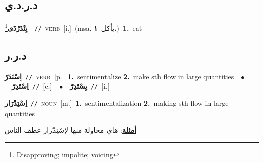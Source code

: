 \documentclass[10pt,a4paper,twoside]{article} %
\begin{document}
\begin{multicols}{2}
\vspace{-3mm}
\subsection*{\color{blue}\foreignlanguage{arabic}{د.ر.د.ي}\color{blue}{ (ntws)}} 

{\setlength\topsep{0pt}\textbf{\foreignlanguage{arabic}{يِتْدَرْدَى}}\footnote{Disapproving; impolite; voicing}\ \ {\color{gray}\texttt{//}\color{black}}\ \textsc{verb}\ [i.]\ \color{gray}(msa. \foreignlanguage{arabic}{يأكل}~\foreignlanguage{arabic}{\textbf{١.}})\color{black}\ \textbf{1.}~eat\ } \vspace{2mm}

\vspace{-3mm}
\subsection*{\color{blue}\foreignlanguage{arabic}{د.ر.ر}\color{blue}{}} 

{\setlength\topsep{0pt}\textbf{\foreignlanguage{arabic}{اِسْتَدَرّ}}\ {\color{gray}\texttt{//}\color{black}}\ \textsc{verb}\ [p.]\ \textbf{1.}~sentimentalize  \textbf{2.}~make sth flow in large quantities\ \ $\bullet$\ \ \setlength\topsep{0pt}\textbf{\foreignlanguage{arabic}{اِسْتَدِرّ}}\ {\color{gray}\texttt{//}\color{black}}\ [c.]\ \ $\bullet$\ \ \setlength\topsep{0pt}\textbf{\foreignlanguage{arabic}{يِسْتَدِرّ}}\ {\color{gray}\texttt{//}\color{black}}\ [i.]\ } \vspace{2mm}

{\setlength\topsep{0pt}\textbf{\foreignlanguage{arabic}{اِسْتِدْرَار}}\ {\color{gray}\texttt{//}\color{black}}\ \textsc{noun}\ [m.]\ \textbf{1.}~sentimentalization  \textbf{2.}~making sth flow in large quantities\  \begin{flushright}\color{gray}\foreignlanguage{arabic}{\textbf{\underline{\foreignlanguage{arabic}{أمثلة}}}: هاي محاولة منها لاِسْتِدْرار عطف الناس}\end{flushright}\color{black}} \vspace{2mm}


\end{multicols}
\end{document}
